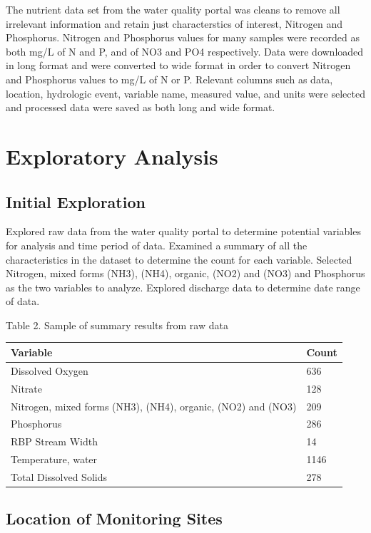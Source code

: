 \documentclass[12pt,]{article}
\begin{document}
The nutrient data set from the water quality portal was cleans to remove
all irrelevant information and retain just characterstics of interest,
Nitrogen and Phosphorus. Nitrogen and Phosphorus values for many samples
were recorded as both mg/L of N and P, and of NO3 and PO4 respectively.
Data were downloaded in long format and were converted to wide format in
order to convert Nitrogen and Phosphorus values to mg/L of N or P.
Relevant columns such as data, location, hydrologic event, variable
name, measured value, and units were selected and processed data were
saved as both long and wide format.

\newpage

\hypertarget{exploratory-analysis}{%
\section{Exploratory Analysis}\label{exploratory-analysis}}

\hypertarget{initial-exploration}{%
\subsection{Initial Exploration}\label{initial-exploration}}

Explored raw data from the water quality portal to determine potential
variables for analysis and time period of data. Examined a summary of
all the characteristics in the dataset to determine the count for each
variable. Selected Nitrogen, mixed forms (NH3), (NH4), organic, (NO2)
and (NO3) and Phosphorus as the two variables to analyze. Explored
discharge data to determine date range of data.

Table 2. Sample of summary results from raw data

\begin{longtable}[]{@{}ll@{}}
\toprule
Variable & Count\tabularnewline
\midrule
\endhead
Dissolved Oxygen & 636\tabularnewline
Nitrate & 128\tabularnewline
Nitrogen, mixed forms (NH3), (NH4), organic, (NO2) and (NO3) &
209\tabularnewline
Phosphorus & 286\tabularnewline
RBP Stream Width & 14\tabularnewline
Temperature, water & 1146\tabularnewline
Total Dissolved Solids & 278\tabularnewline
\bottomrule
\end{longtable}

\hypertarget{location-of-monitoring-sites}{%
\subsection{Location of Monitoring
Sites}\label{location-of-monitoring-sites}}
\end{document}
